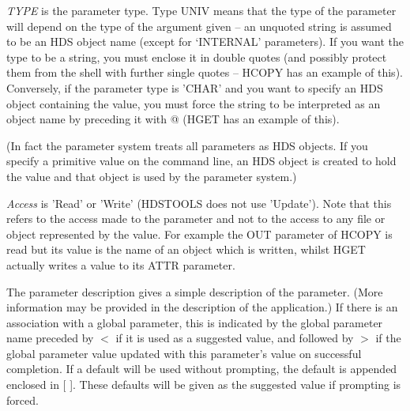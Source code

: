 \documentclass[twoside,11pt]{article}
\renewcommand{\_}{\texttt{\symbol{95}}}
\begin{document}
\textit{TYPE} is the parameter type. Type UNIV means that the type of the
parameter will depend on the type of the argument given -- an unquoted string
is assumed to be an HDS object name (except for `INTERNAL' parameters).
If you want the type to be a string, you must enclose it in double quotes (and
possibly protect them from the shell with further single quotes -- HCOPY has
an example of this). Conversely, if the parameter type is '\_CHAR' and you want
to specify an HDS object containing the value, you must force the string to be
interpreted as an object name by preceding it with @ (HGET has an example of
this).

(In fact the parameter system treats all parameters as HDS objects. If you
specify a primitive value on the command line, an HDS object is created to
hold the value and that object is used by the parameter system.)

\textit{Access} is 'Read' or 'Write' (HDSTOOLS does not use 'Update'). Note
that this refers to the access made to the parameter and not to the access to
any file or object represented by the value. For example the OUT parameter of
HCOPY is read but its value is the name of an object which is written, whilst
HGET actually writes a value to its ATTR parameter.

The parameter description gives a simple description of the parameter.
(More information may be provided in the description of the application.)
If there is an association with a global parameter, this is indicated by the
global parameter name preceded by $<$ if it is used as a suggested value, and
followed by $>$ if the global parameter value updated with this parameter's
value on successful completion.
If a default will be used without prompting, the default is appended enclosed
in [ ].
These defaults will be given as the suggested value if prompting is forced.
\end{document}
